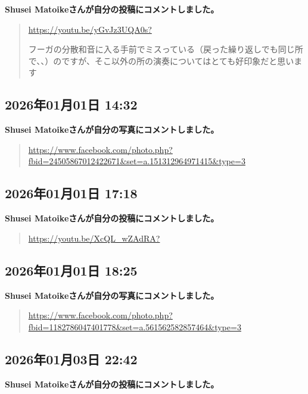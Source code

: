 \textbf{Shusei Matoikeさんが自分の投稿にコメントしました。}

\begin{quote}
\url{https://youtu.be/yGvJz3UQA0s?}

フーガの分散和音に入る手前でミスっている（戻った繰り返しでも同じ所で、、）のですが、そこ以外の所の演奏についてはとても好印象だと思います
\end{quote}

\subsection*{2026年01月01日 14:32}

\textbf{Shusei Matoikeさんが自分の写真にコメントしました。}

\begin{quote}
\url{https://www.facebook.com/photo.php?fbid=24505867012422671&set=a.151312964971415&type=3}
\end{quote}

\subsection*{2026年01月01日 17:18}

\textbf{Shusei Matoikeさんが自分の投稿にコメントしました。}

\begin{quote}
\url{https://youtu.be/XcQL_wZAdRA?}
\end{quote}

\subsection*{2026年01月01日 18:25}

\textbf{Shusei Matoikeさんが自分の写真にコメントしました。}

\begin{quote}
\url{https://www.facebook.com/photo.php?fbid=1182786047401778&set=a.561562582857464&type=3}
\end{quote}

\subsection*{2026年01月03日 22:42}

\textbf{Shusei Matoikeさんが自分の投稿にコメントしました。}

